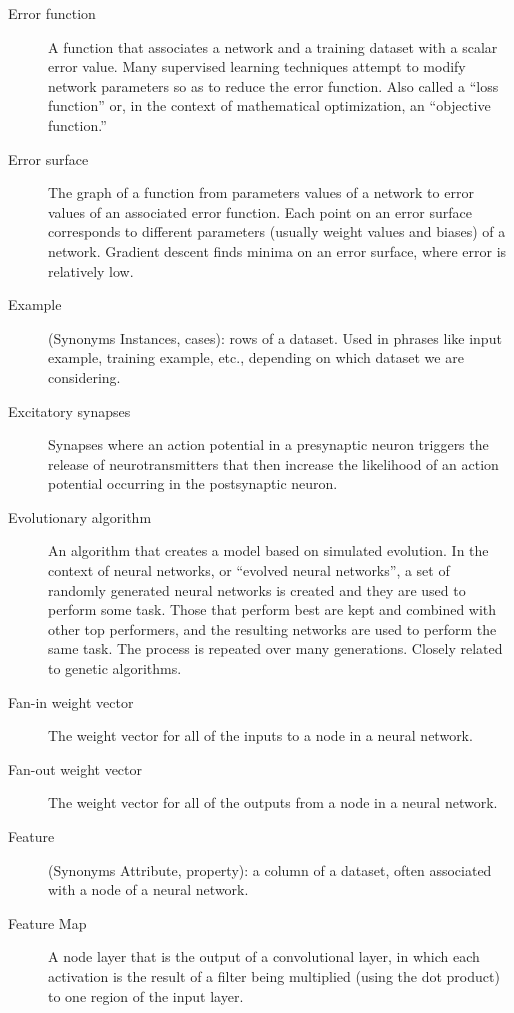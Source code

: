 \begin{description}
\item[Error function] A function that associates a network and a training dataset with a scalar error value. Many supervised learning techniques attempt to modify network parameters so as to reduce the error function. Also called a ``loss function'' or, in the context of mathematical optimization, an ``objective function.''

\item[Error surface] The graph of a function from parameters values of a network to error values of an associated error function. Each point on an error surface corresponds to different parameters (usually weight values and biases) of a network. Gradient descent finds minima on an error surface, where error is relatively low.

\item[Example] (Synonyms Instances, cases): rows of a dataset. Used in phrases like input example, training example, etc., depending on which dataset we are considering.

\item[Excitatory synapses] Synapses where an action potential in a presynaptic neuron triggers the release of neurotransmitters that then increase the likelihood of an action potential occurring in the postsynaptic neuron.

\item[Evolutionary algorithm] An algorithm that creates a model based on simulated evolution. In the context of neural networks, or ``evolved neural networks'', a set of randomly generated neural networks is created and they are used to perform some task.  Those that perform best are kept and combined with other top performers, and the resulting networks are used to perform the same task. The process is repeated over many generations. Closely related to genetic algorithms.

\item[Fan-in weight vector] The weight vector for all of the inputs to a node in a neural network.

\item[Fan-out weight vector] The weight vector for all of the outputs from a node in a neural network.

\item[Feature] (Synonyms Attribute, property): a column of a dataset, often associated with a node of a neural network.

\item[Feature Map] A node layer that is the output of a convolutional layer, in which each activation is the result of a filter being multiplied (using the dot product) to one region of the input layer.


\end{description}
